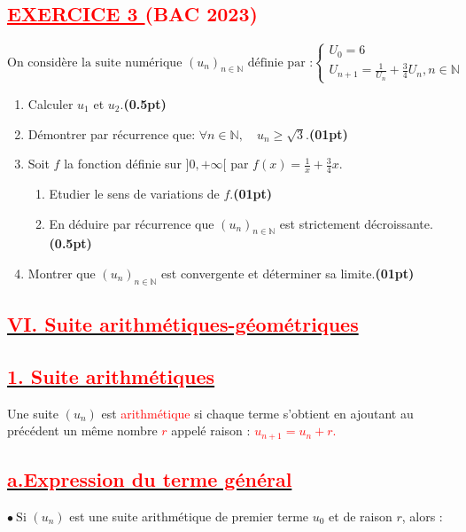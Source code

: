 \documentclass{article}
\begin{document}
\subsection*{\textcolor{red}{\underline{EXERCICE 3 } (BAC 2023) }}
\[
\text{On considère la suite numérique } (u_n)_{n \in \mathbb{N}} \text{ définie par :}
\begin{cases}
U_{0}=6\\
U_{n+1}=\frac{1}{U_{n}}+\frac{3}{4}U_{n}, n\in\mathbb{N}
\end{cases}
\]
\begin{enumerate}
\item[1)] Calculer \( u_1 \) et \( u_2 \).\hfill\textbf{(0.5pt)}

\item[2)] Démontrer par récurrence que: \( \forall n\in\mathbb{N},\quad u_n \geq \sqrt{3} \).\hfill\textbf{(01pt)}

\item[3)] Soit $f$ la fonction définie sur $]0, +\infty[$ par \( f(x) = \frac{1}{x} + \frac{3}{4}x \).
\begin{enumerate}
\item[a)] Etudier le sens de variations de $f$.\hfill\textbf{(01pt)}
\item[b)] En déduire par récurrence que $(u_n)_{n \in \mathbb{N}}$ est strictement décroissante.\hfill\textbf{(0.5pt)}
\end{enumerate}

\item[4)] Montrer que $(u_n)_{n \in \mathbb{N}}$ est convergente et déterminer sa limite.\hfill\textbf{(01pt)}

\end{enumerate}
\subsection*{\underline{\textbf{\textcolor{red}{VI. Suite arithmétiques-géométriques}}}}
\subsection*{\underline{\textbf{\textcolor{red}{1. Suite arithmétiques}}}}
Une suite $\left(u_{n}\right)$ est \textcolor{red}{arithmétique} si chaque terme s'obtient en ajoutant au précédent un même nombre \textcolor{red}{$r$} appelé raison : 
\textcolor{red}{$u_{n+1}=u_{n}+r.$} 
\subsection*{\underline{\textbf{\textcolor{red}{a.Expression du terme général}}}}		
$\bullet\ \text{Si }\left(u_{n}\right)$ est une suite arithmétique de premier terme $u_{0}$ et de raison $r$, alors :
	
\end{document}
